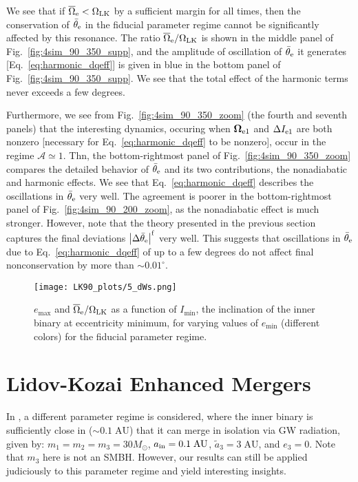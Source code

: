 \documentclass[
        twocolumn,
        twocolappendix
    ]{aastex63}
\newcommand*{\abs}[1]{\left|#1\right|}
\renewcommand*{\bm}[1]{\boldsymbol{\mathbf{#1}}}
\begin{document}
We see that if $\overline{\Omega}_{\rm e} < \Omega_{\rm LK}$ by a sufficient
margin for all times, then the conservation of $\bar{\theta}_{\rm e}$ in the
fiducial parameter regime cannot be significantly affected by this resonance.
The ratio $\overline{\Omega}_{\rm e} / \Omega_{\rm LK}$ is shown in the middle
panel of Fig.~\ref{fig:4sim_90_350_supp}, and the amplitude of oscillation of
$\bar{\theta}_{\rm e}$ it generates [Eq.~\eqref{eq:harmonic_dqeff}] is given in
blue in the bottom panel of Fig.~\ref{fig:4sim_90_350_supp}. We see that the
total effect of the harmonic terms never exceeds a few degrees.

Furthermore, we see from Fig.~\ref{fig:4sim_90_350_zoom} (the fourth and seventh
panels) that the interesting dynamics, occuring when $\bm{\Omega}_{\rm e1}$ and
$\Delta I_{\rm e1}$ are both nonzero [necessary for
Eq.~\eqref{eq:harmonic_dqeff} to be nonzero], occur in the regime $\mathcal{A}
\simeq 1$. Thn, the bottom-rightmost panel of Fig.~\ref{fig:4sim_90_350_zoom}
compares the detailed behavior of $\bar{\theta}_{\rm e}$ and its two
contributions, the nonadiabatic and harmonic effects. We see that
Eq.~\eqref{eq:harmonic_dqeff} describes the oscillations in $\bar{\theta}_{\rm
e}$ very well. The agreement is poorer in the bottom-rightmost panel of
Fig.~\ref{fig:4sim_90_200_zoom}, as the nonadiabatic effect is much stronger.
However, note that the theory presented in the previous section captures the
final deviations $\abs{\Delta \bar{\theta}_{\rm e}}^{\rm f}$ very well. This
suggests that oscillations in $\bar{\theta}_{\rm e}$ due to
Eq.~\eqref{eq:harmonic_dqeff} of up to a few degrees do not affect final
nonconservation by more than $\sim 0.01^\circ$.

\begin{figure}
    \centering
    \texttt{[image: LK90\_plots/5\_dWs.png]}
    \caption{$e_{\max}$ and $\overline{\Omega}_{\rm e} / \Omega_{\rm LK}$ as a
    function of $I_{\min}$, the inclination of the inner binary at eccentricity
    minimum, for varying values of $e_{\min}$ (different colors) for the
    fiducial parameter regime. }\label{fig:dWs}
\end{figure}

\section{Lidov-Kozai Enhanced Mergers}\label{s:lk_enhanced}

In \citet{bin1}, a different parameter regime is considered,
where the inner binary is sufficiently close in ($\sim 0.1\;\mathrm{AU}$) that
it can merge in isolation via GW radiation, given by: $m_1 = m_2 = m_3 =
30M_{\odot}$, $a_{\rm in} = 0.1\;\mathrm{AU}$, $\tilde{a}_3 = 3\;\mathrm{AU}$,
and $e_3 = 0$. Note that $m_3$ here is not an SMBH\@. However, our results can
still be applied judiciously to this parameter regime and yield interesting
insights.
\end{document}

